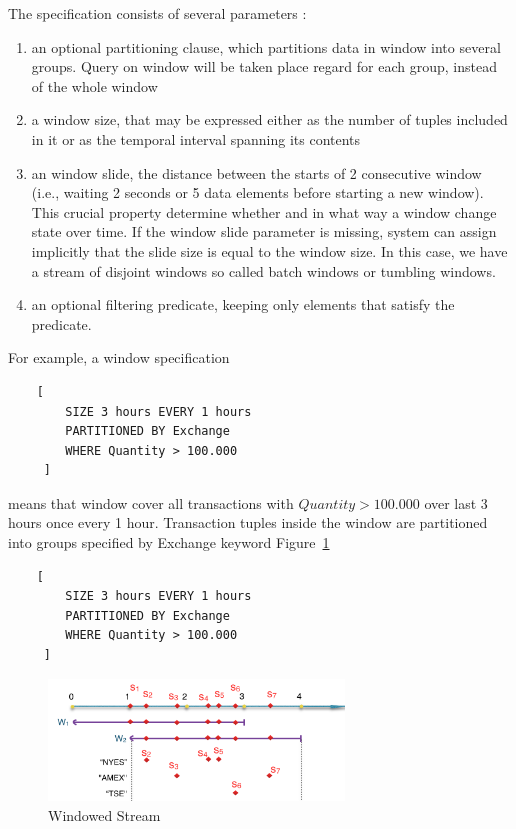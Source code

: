 The specification consists of several parameters :
\begin{enumerate}
\item an optional partitioning clause, which partitions data in window into several groups. Query on window will be taken place regard for each group, instead of the whole window
\item a window size, that may be expressed either as the number of tuples included in it or as the temporal interval spanning its contents
\item an window slide, the distance between the starts of 2 consecutive window (i.e., waiting 2 seconds or 5 data elements before starting a new window). This crucial property determine whether and in what way a window change state over time. If the window slide parameter is missing, system can  assign implicitly that the slide size is equal to the window size. In this case, we have a stream of disjoint windows so called batch windows or tumbling windows.
\item an optional filtering predicate, keeping only elements that satisfy the predicate.
\end{enumerate}

For example, a window specification 
\begin{verbatim}
	[
		SIZE 3 hours EVERY 1 hours 
	 	PARTITIONED BY Exchange
	 	WHERE Quantity > 100.000
	 ]
\end{verbatim}
means that window cover all transactions with $Quantity > 100.000$ over last 3 hours once every 1 hour. Transaction tuples inside the window are partitioned into groups specified by Exchange keyword Figure~\ref{fig:winSpec}
\begin{lstlisting}
	[
		SIZE 3 hours EVERY 1 hours 
	 	PARTITIONED BY Exchange
	 	WHERE Quantity > 100.000
	 ]
\end{lstlisting}

\begin{figure}[htbp!] 
\centering    
\includegraphics[width=0.7\textwidth]{winSpec}
\caption{Windowed Stream}
\label{fig:winSpec}
\end{figure}

